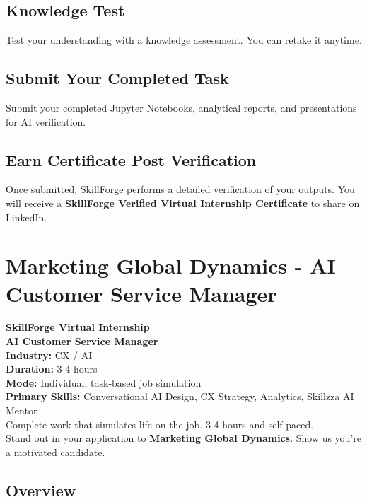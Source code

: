 \documentclass{article}
\begin{document}
\subsection*{Knowledge Test}
Test your understanding with a knowledge assessment. You can retake it anytime.\\

\subsection*{Submit Your Completed Task}
Submit your completed Jupyter Notebooks, analytical reports, and presentations for AI verification.\\

\subsection*{Earn Certificate Post Verification}
Once submitted, SkillForge performs a detailed verification of your outputs. You will receive a \textbf{SkillForge Verified Virtual Internship Certificate} to share on LinkedIn.\\

\newpage

\section{Marketing Global Dynamics - AI Customer Service Manager}

\textbf{SkillForge Virtual Internship} \\
\textbf{AI Customer Service Manager} \\

\textbf{Industry:} CX / AI \\
\textbf{Duration:} 3-4 hours \\
\textbf{Mode:} Individual, task-based job simulation \\
\textbf{Primary Skills:} Conversational AI Design, CX Strategy, Analytics, Skillzza AI Mentor \\

Complete work that simulates life on the job. 3-4 hours and self-paced. \\
Stand out in your application to \textbf{Marketing Global Dynamics}. Show us you're a motivated candidate. \\

\subsection*{Overview}
\end{document}

